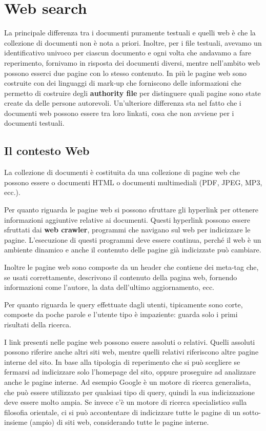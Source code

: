 
\chapter{Web search}

La principale differenza tra i documenti puramente testuali e quelli web è che la collezione di documenti non è nota a priori.
Inoltre, per i file testuali, avevamo un identificativo univoco per ciascun documento e ogni volta che andavamo a fare reperimento, fornivamo in risposta dei documenti diversi, mentre nell'ambito web possono esserci due pagine con lo stesso contenuto.
In più le pagine web sono costruite con dei linguaggi di mark-up che forniscono delle informazioni che permetto di costruire degli \textbf{authority file} per distinguere quali pagine sono state create da delle persone autorevoli.
Un'ulteriore differenza sta nel fatto che i documenti web possono essere tra loro linkati, cosa che non avviene per i documenti testuali.

\section{Il contesto Web}

La collezione di documenti è costituita da una collezione di pagine web che possono essere o documenti HTML o documenti multimediali (PDF, JPEG, MP3, ecc.).

Per quanto riguarda le pagine web si possono sfruttare gli hyperlink per ottenere informazioni aggiuntive relative ai documenti.
Questi hyperlink possono essere sfruttati dai \textbf{web crawler}, programmi che navigano sul web per indicizzare le pagine.
L'esecuzione di questi programmi deve essere continua, perché il web è un ambiente dinamico e anche il contenuto delle pagine già indicizzate può cambiare.

Inoltre le pagine web sono composte da un header che contiene dei meta-tag che, se usati correttamente, descrivono il contenuto della pagina web, fornendo informazioni come l'autore, la data dell'ultimo aggiornamento, ecc.

Per quanto riguarda le query effettuate dagli utenti, tipicamente sono corte, composte da poche parole e l'utente tipo è impaziente: guarda solo i primi risultati della ricerca.

I link presenti nelle pagine web possono essere assoluti o relativi. Quelli assoluti possono riferire anche altri siti web, mentre quelli relativi riferiscono altre pagine interne del sito.
In base alla tipologia di reperimento che si può scegliere se fermarsi ad indicizzare solo l'homepage del sito, oppure proseguire ad analizzare anche le pagine interne.
Ad esempio Google è un motore di ricerca generalista, che può essere utilizzato per qualsiasi tipo di query, quindi la sua indicizzazione deve essere molto ampia. Se invece c'è un motore di ricerca specialistico sulla filosofia orientale, ci si può accontentare di indicizzare tutte le pagine di un sotto-insieme (ampio) di siti web, considerando tutte le pagine interne.

